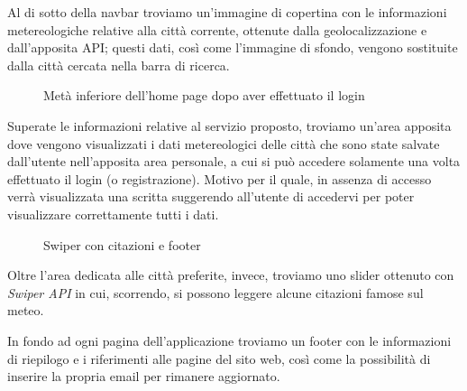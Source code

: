 \vspace{5mm}

Al di sotto della navbar troviamo un'immagine di copertina con le informazioni metereologiche relative alla città corrente, ottenute dalla geolocalizzazione e dall'apposita API;
questi dati, così come l'immagine di sfondo, vengono sostituite dalla città cercata nella barra di ricerca.

\begin{figure}[ht]
    \centering
    \caption{Metà inferiore dell'home page dopo aver effettuato il login}
\end{figure}

Superate le informazioni relative al servizio proposto, troviamo un'area apposita dove vengono visualizzati i dati metereologici delle città che sono state
salvate dall'utente nell'apposita area personale, a cui si può accedere solamente una volta effettuato il login (o registrazione). Motivo per il quale, in assenza di accesso verrà visualizzata una scritta
suggerendo all'utente di accedervi per poter visualizzare correttamente tutti i dati.

\begin{figure}[ht]
    \centering
    \caption{Swiper con citazioni e footer}
\end{figure}

Oltre l'area dedicata alle città preferite, invece, troviamo uno slider ottenuto con \emph{Swiper API} in cui, scorrendo, si possono leggere alcune citazioni famose sul meteo.

\vspace{5mm}

In fondo ad ogni pagina dell'applicazione troviamo un footer con le informazioni di riepilogo e i riferimenti alle pagine del sito web, così come la possibilità di inserire la propria email per
rimanere aggiornato.


